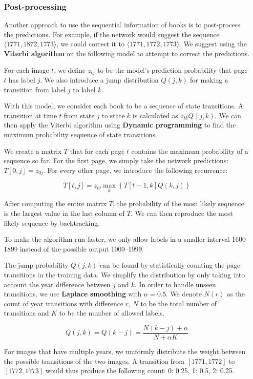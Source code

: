 \subsubsection{Post-processing}

Another approach to use the sequential information of books is to post-process the predictions. For example, if the network would suggest the sequence $\langle 1771, 1872, 1773 \rangle$, we could correct it to $\langle 1771, 1772, 1773 \rangle$. We suggest using the \textbf{Viterbi algorithm} on the following model to attempt to correct the predictions.

For each image $t$, we define $z_{tj}$ to be the model's prediction probability that page $t$ has label $j$. We also introduce a jump distribution $Q(j, k)$ for making a transition from label $j$ to label $k$.

With this model, we consider each book to be a sequence of state transitions. A transition at time $t$ from state $j$ to state $k$ is calculated as $z_{tk} Q(j, k)$. We can then apply the Viterbi algorithm using \textbf{Dynamic programming} to find the maximum probability sequence of state transitions.

We create a matrix $T$ that for each page $t$ contains the maximum probability of a sequence so far. For the first page, we simply take the network predictions: $T[0,j] = z_{0j}$. For every other page, we introduce the following recurrence:

\[
T[t,j] = z_{tj} \max_k \left\{ T[t-1,k] Q(k, j) \right\}
\]

After computing the entire matrix $T$, the probability of the most likely sequence is the largest value in the last column of $T$. We can then reproduce the most likely sequence by backtracking.

To make the algorithm run faster, we only allow labels in a smaller interval 1600--1899 instead of the possible output 1000--1999.

The jump probability $Q(j, k)$ can be found by statistically counting the page transitions in the training data. We simplify the distribution by only taking into account the year difference between $j$ and $k$. In order to handle unseen transitions, we use \textbf{Laplace smoothing} with $\alpha=0.5$. We denote $N(r)$ as the count of year transitions with difference $r$, $N$ to be the total number of transitions and $K$ to be the number of allowed labels.

\[
Q(j, k) = Q(k-j) = \frac{N(k-j) + \alpha}{N + \alpha K}
\]

For images that have multiple years, we uniformly distribute the weight between the possible transitions of the two images. A transition from $[1771, 1772]$ to $[1772, 1773]$ would thus produce the following count: {0: 0.25, 1: 0.5, 2: 0.25}.


